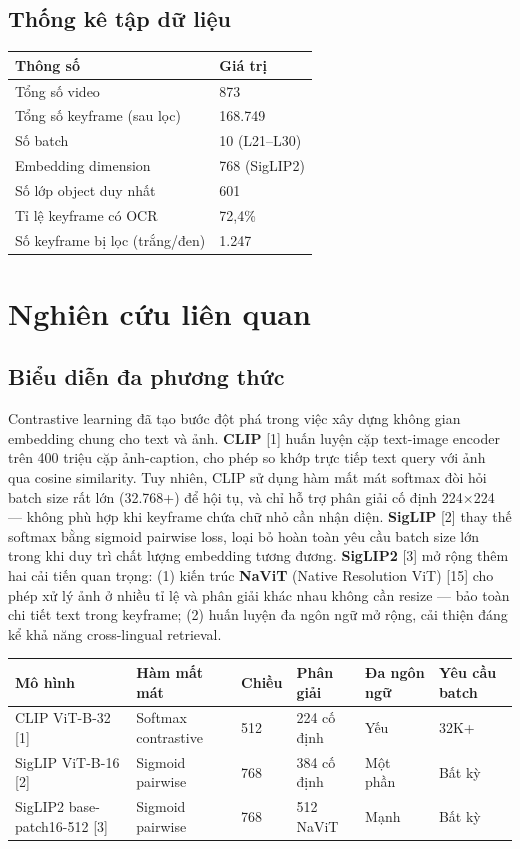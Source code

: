 \documentclass[12pt,a4paper,onecolumn]{article}
\begin{document}
\subsection{Thống kê tập dữ liệu}

\begin{center}
\begin{tabular}{l l}
\toprule
Thông số & Giá trị \\
\midrule
Tổng số video & 873 \\
Tổng số keyframe (sau lọc) & 168.749 \\
Số batch & 10 (L21–L30) \\
Embedding dimension & 768 (SigLIP2) \\
Số lớp object duy nhất & 601 \\
Tỉ lệ keyframe có OCR & 72,4\% \\
Số keyframe bị lọc (trắng/đen) & 1.247 \\
\bottomrule
\end{tabular}
\end{center}


\section{Nghiên cứu liên quan}

\subsection{Biểu diễn đa phương thức}

Contrastive learning đã tạo bước đột phá trong việc xây dựng không gian embedding chung cho text và ảnh. \textbf{CLIP} [1] huấn luyện cặp text-image encoder trên 400 triệu cặp ảnh-caption, cho phép so khớp trực tiếp text query với ảnh qua cosine similarity. Tuy nhiên, CLIP sử dụng hàm mất mát softmax đòi hỏi batch size rất lớn (32.768+) để hội tụ, và chỉ hỗ trợ phân giải cố định 224×224 — không phù hợp khi keyframe chứa chữ nhỏ cần nhận diện. \textbf{SigLIP} [2] thay thế softmax bằng sigmoid pairwise loss, loại bỏ hoàn toàn yêu cầu batch size lớn trong khi duy trì chất lượng embedding tương đương. \textbf{SigLIP2} [3] mở rộng thêm hai cải tiến quan trọng: (1) kiến trúc \textbf{NaViT} (Native Resolution ViT) [15] cho phép xử lý ảnh ở nhiều tỉ lệ và phân giải khác nhau không cần resize — bảo toàn chi tiết text trong keyframe; (2) huấn luyện đa ngôn ngữ mở rộng, cải thiện đáng kể khả năng cross-lingual retrieval.

\begin{center}
\small
\begin{tabular}{l l l l l l}
\toprule
Mô hình & Hàm mất mát & Chiều & Phân giải & Đa ngôn ngữ & Yêu cầu batch \\
\midrule
CLIP ViT-B-32 [1] & Softmax contrastive & 512 & 224 cố định & Yếu & 32K+ \\
SigLIP ViT-B-16 [2] & Sigmoid pairwise & 768 & 384 cố định & Một phần & Bất kỳ \\
SigLIP2 base-patch16-512 [3] & Sigmoid pairwise & 768 & 512 NaViT & Mạnh & Bất kỳ \\
\bottomrule
\end{tabular}
\end{center}
\end{document}
